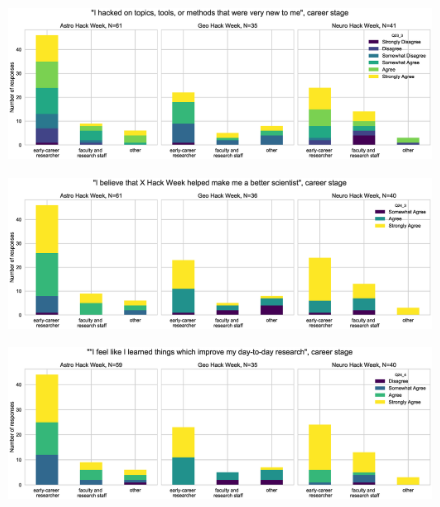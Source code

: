 \documentclass{aastex62}
\begin{document}
\begin{figure}[h!]
\centering
\includegraphics[width=\textwidth]{Q23_3_Q3_stackedbars.eps}
\caption{}
\label{fig:corr1}
\end{figure}

\begin{figure}[h!]
\centering
\includegraphics[width=\textwidth]{Q24_3_Q3_stackedbars.eps}
\caption{}
\label{fig:corr2}
\end{figure}

\begin{figure}[h!]
\centering
\includegraphics[width=\textwidth]{Q24_4_Q3_stackedbars.eps}
\caption{}
\label{fig:corr3}
\end{figure}
\end{document}
